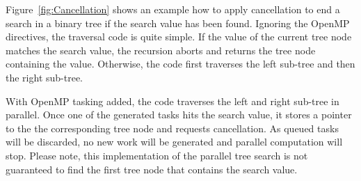 Figure~\ref{fig:Cancellation} shows an example how to apply cancellation to end a search in a binary tree if the search value has been found.
Ignoring the OpenMP directives, the traversal code is quite simple.
If the value of the current tree node matches the search value, the recursion aborts and returns the tree node containing the value.
Otherwise, the code first traverses the left sub-tree and then the right sub-tree.

With OpenMP tasking added, the code traverses the left and right sub-tree in parallel.
Once one of the generated tasks hits the search value, it stores a pointer to the the corresponding tree node and requests cancellation.
As queued tasks will be discarded, no new work will be generated and parallel computation will stop.
Please note, this implementation of the parallel tree search is not guaranteed to find the first tree node that contains the search value.

